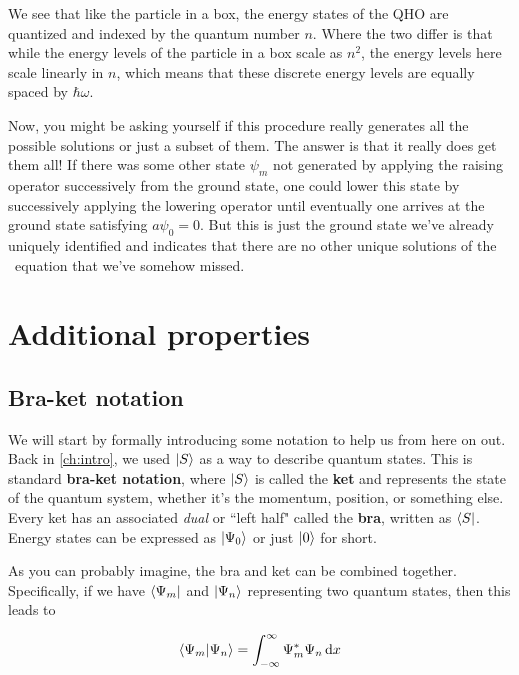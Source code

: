 We see that like the particle in a box, the energy states of the QHO are quantized and indexed by the quantum number $n$. 
Where the two differ is that while the energy levels of the particle in a box scale as $n^2$, the energy levels here scale linearly in $n$, which means that these discrete energy levels are equally spaced by $\hbar\omega$. 

Now, you might be asking yourself if this procedure really generates all the possible solutions or just a subset of them. 
The answer is that it really does get them all! 
If there was some other state $\psi_m$ not generated by applying the raising operator successively from the ground state, one could lower this state by successively applying the lowering operator until eventually one arrives at the ground state satisfying $a\psi_0 = 0$. 
But this is just the ground state we've already uniquely identified and indicates that there are no other unique solutions of the \Sch\ equation that we've somehow missed.


\section{Additional properties}

\subsection{Bra-ket notation} \label{sec:braket}

We will start by formally introducing some notation to help us from here on out. 
Back in \autoref{ch:intro}, we used $\ket{S}$ as a way to describe quantum states. 
This is standard \textbf{bra-ket notation}, where $\ket{S}$ is called the \textbf{ket} and represents the state of the quantum system, whether it's the momentum, position, or something else. 
Every ket has an associated \emph{dual} or ``left half" called the \textbf{bra}, written as $\bra{S}$. 
Energy states can be expressed as $\ket{\Psi_0}$ or just $\ket{0}$ for short.

As you can probably imagine, the bra and ket can be combined together. 
Specifically, if we have $\bra{\Psi_m}$ and $\ket{\Psi_n}$ representing two quantum states, then this leads to

\begin{tcolorbox}[title = Bra-ket inner product] \vspace{-2ex}
	\begin{equation}
		\braket{\Psi_m}{\Psi_n} = 
		\int_{-\infty}^{\infty} \Psi_m^*\Psi_n \dd{x} \label{eq:bk-int}
	\end{equation}
\end{tcolorbox}

